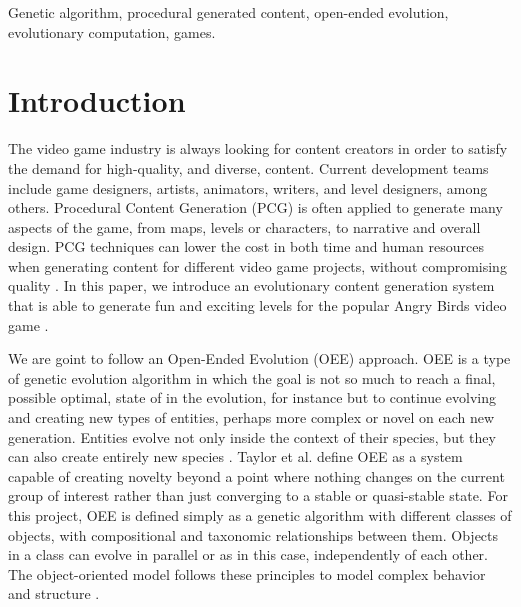 \documentclass[conference]{IEEEtran}
\begin{document}
\begin{IEEEkeywords}
Genetic algorithm, procedural generated content, open-ended evolution,
evolutionary computation, games.
\end{IEEEkeywords}
    
\section{Introduction}

The video game industry is always looking for content creators in order to satisfy
the demand for high-quality, and diverse, content. Current development teams include game 
designers,  artists, animators,  writers, and level designers, among others.
Procedural Content Generation (PCG) is often applied to generate many
aspects of the game, from maps, levels or characters, to narrative and overall
design. PCG techniques can lower the cost in both time and human resources
when generating content for different video game projects, without
compromising quality \cite{Yannakakis2017,YannakakisContentGeneration}. In
this paper, we introduce an evolutionary content generation system that is able to 
generate fun and exciting levels for the popular Angry Birds video game \cite{RovioEntertainmentCorporation2009}.


We are goint to follow an Open-Ended Evolution (OEE) approach.  OEE is a type of genetic evolution algorithm in which the goal is
not so much to reach a final, possible optimal, state of in the evolution, for instance but to continue evolving and
creating new types of entities, perhaps more complex or novel on each new
generation. Entities evolve not only inside the context of their species, but
they can also create entirely new species \cite{Standish2003}. Taylor et al.
\cite{Taylor2016, Taylor} define OEE as a system capable of creating novelty
beyond a point where nothing changes on the current group of interest rather
than just converging to a stable or quasi-stable state. For this project,
OEE is defined simply as a genetic algorithm with different classes of
objects, with compositional and taxonomic relationships between them.
Objects in a class can evolve in parallel or as in this case, independently
of each other. The object-oriented model follows these principles to model
complex behavior and structure \cite{levesque1986knowledge}. %
\end{document}
